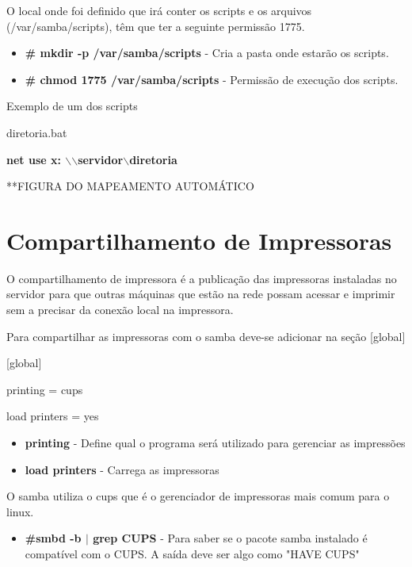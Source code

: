 
O local onde foi definido que irá conter os scripts e os arquivos (/var/samba/scripts), têm que ter a seguinte permissão 1775. 

\begin{itemize}
	\item \textbf{\# mkdir -p /var/samba/scripts} - Cria a pasta onde estarão os scripts.
	\item \textbf{\# chmod 1775 /var/samba/scripts} - Permissão de execução dos scripts.
\end{itemize}

Exemplo de um dos scripts 

diretoria.bat 

\textbf{net use x: $\backslash$$\backslash$servidor$\backslash$diretoria}

**FIGURA DO MAPEAMENTO AUTOMÁTICO 

\section{Compartilhamento de Impressoras}

O compartilhamento de impressora é a publicação das impressoras instaladas no servidor para que outras máquinas que estão na rede possam acessar e imprimir sem a precisar da conexão local na impressora.

Para compartilhar as impressoras com o samba deve-se adicionar na seção [global] 

[global]

printing = cups

load printers = yes

\begin{itemize}
	\item \textbf{printing} - Define qual o programa será utilizado para gerenciar as impressões 
	\item \textbf{load printers} - Carrega as impressoras
\end{itemize}

O samba utiliza o cups que é o gerenciador de impressoras mais comum para o linux.

\begin{itemize}
	\item \textbf{\#smbd -b $|$ grep CUPS} - Para saber se o pacote samba instalado é compatível com o CUPS. A saída deve ser algo como "HAVE CUPS"
\end{itemize}

